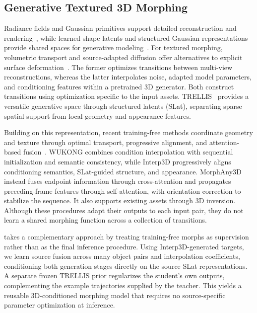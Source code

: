 \subsection{Generative Textured 3D Morphing}
Radiance fields and Gaussian primitives support detailed reconstruction and rendering~\cite{mildenhall2020nerf,kerbl2023gaussians}, while learned shape latents and structured Gaussian representations provide shared spaces for generative modeling~\cite{zhang2023shape2vecset,zhang2024gaussiancube}. For textured morphing, volumetric transport and source-adapted diffusion
offer alternatives to explicit surface deformation~\cite{tsai2022morphflow,Yang_2025_ICCV}. The former optimizes transitions between multi-view reconstructions, whereas the latter interpolates noise, adapted model parameters, and conditioning features within a pretrained 3D generator. Both construct transitions using optimization specific to the input assets. TRELLIS~\cite{xiang2025trellis} provides a versatile generative space through structured latents (SLat), separating sparse spatial support from local geometry and appearance features.

Building on this representation, recent training-free methods coordinate geometry and texture through optimal transport, progressive alignment, and attention-based fusion~\cite{yin2025wukong,liu2026interp3d,sun2026morphany3d}. WUKONG combines condition interpolation with sequential initialization and semantic consistency, while Interp3D progressively aligns conditioning semantics, SLat-guided structure, and appearance. MorphAny3D instead fuses endpoint information through cross-attention and propagates preceding-frame
features through self-attention, with orientation correction to stabilize the sequence. It also supports existing assets through 3D inversion. Although these procedures adapt their outputs to each input pair, they do not learn a shared morphing function across a collection of transitions.

\methodname{} takes a complementary approach by treating training-free morphs as supervision rather than as the final inference procedure. Using Interp3D-generated targets, we learn source fusion across many object pairs and interpolation coefficients, conditioning both generation stages directly on the source SLat representations. A separate frozen TRELLIS prior
regularizes the student's own outputs, complementing the example trajectories supplied by the teacher. This yields a reusable
3D-conditioned morphing model that requires no source-specific parameter optimization at inference.
